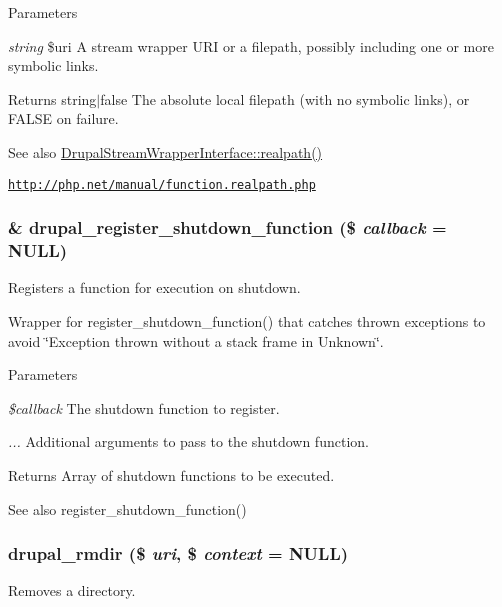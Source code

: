 \begin{DoxyParams}{Parameters}
\item[{\em string}]\$uri A stream wrapper URI or a filepath, possibly including one or more symbolic links.\end{DoxyParams}
\begin{DoxyReturn}{Returns}
string$|$false The absolute local filepath (with no symbolic links), or FALSE on failure.
\end{DoxyReturn}
\begin{DoxySeeAlso}{See also}
\hyperlink{interfaceDrupalStreamWrapperInterface_adb16cd1ac42f9d7a273546f5cbf0d9d3}{DrupalStreamWrapperInterface::realpath()} 

\href{http://php.net/manual/function.realpath.php}{\tt http://php.net/manual/function.realpath.php} 
\end{DoxySeeAlso}
\hypertarget{group__php__wrappers_gac7eaf11b49995f7f539f5c830a65b34f}{
\subsubsection[{drupal\_\-register\_\-shutdown\_\-function}]{\setlength{\rightskip}{0pt plus 5cm}\& drupal\_\-register\_\-shutdown\_\-function (\$ {\em callback} = {\ttfamily NULL})}}
\label{group__php__wrappers_gac7eaf11b49995f7f539f5c830a65b34f}
Registers a function for execution on shutdown.

Wrapper for register\_\-shutdown\_\-function() that catches thrown exceptions to avoid \char`\"{}Exception thrown without a stack frame in Unknown\char`\"{}.


\begin{DoxyParams}{Parameters}
\item[{\em \$callback}]The shutdown function to register. \item[{\em ...}]Additional arguments to pass to the shutdown function.\end{DoxyParams}
\begin{DoxyReturn}{Returns}
Array of shutdown functions to be executed.
\end{DoxyReturn}
\begin{DoxySeeAlso}{See also}
register\_\-shutdown\_\-function() 
\end{DoxySeeAlso}
\hypertarget{group__php__wrappers_ga394629431629976febfae765abd63e48}{
\subsubsection[{drupal\_\-rmdir}]{\setlength{\rightskip}{0pt plus 5cm}drupal\_\-rmdir (\$ {\em uri}, \/  \$ {\em context} = {\ttfamily NULL})}}
\label{group__php__wrappers_ga394629431629976febfae765abd63e48}
Removes a directory.

